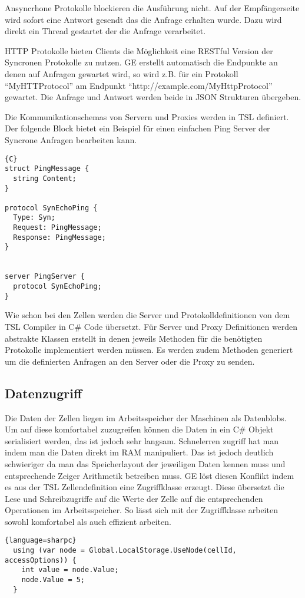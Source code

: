 Ansyncrhone Protokolle blockieren die Ausführung nicht. Auf der Empfängerseite wird sofort eine Antwort gesendt das die Anfrage erhalten wurde. Dazu
wird direkt ein Thread gestartet der die Anfrage verarbeitet.

HTTP Protokolle bieten Clients die Möglichkeit eine RESTful Version der Syncronen Protokolle zu nutzen. GE erstellt automatisch die Endpunkte an denen
auf Anfragen gewartet wird, so wird z.B. für ein Protokoll ``MyHTTProtocol'' am Endpunkt ``http://example.com/MyHttpProtocol'' gewartet. Die Anfrage und
Antwort werden beide in JSON Strukturen übergeben.

Die Kommunikationschemas von Servern und Proxies werden in TSL definiert. Der folgende Block bietet ein Beispiel für einen einfachen Ping Server der
Syncrone Anfragen bearbeiten kann.

\begin{lstlisting}{C}
struct PingMessage {
  string Content;
}

protocol SynEchoPing {
  Type: Syn;
  Request: PingMessage;
  Response: PingMessage;
}


server PingServer {
  protocol SynEchoPing;
}
\end{lstlisting}

Wie schon bei den Zellen werden die Server und Protokolldefinitionen von dem TSL Compiler in C\# Code übersetzt. Für Server und Proxy
Definitionen werden abstrakte Klassen erstellt in denen jeweils Methoden für die benötigten Protokolle implementiert werden müssen.
Es werden zudem Methoden generiert um die definierten Anfragen an den Server oder die Proxy zu senden.


\subsection{Datenzugriff}

Die Daten der Zellen liegen im Arbeitsspeicher der Maschinen als Datenblobs. Um auf diese komfortabel zuzugreifen können die Daten in ein C\# Objekt
serialisiert werden, das ist jedoch sehr langsam.
Schnelerren zugriff hat man indem man die Daten direkt im RAM manipuliert. Das ist jedoch deutlich schwieriger da man das Speicherlayout der jeweiligen Daten
kennen muss und entsprechende Zeiger Arithmetik betreiben muss. GE löst diesen Konflikt indem es aus der TSL Zellendefinition eine Zugriffklasse erzeugt.
Diese übersetzt die Lese und Schreibzugriffe auf die Werte der Zelle auf die entsprechenden Operationen im Arbeitsspeicher. So lässt sich mit der Zugriffklasse arbeiten sowohl
komfortabel als auch effizient arbeiten.

\begin{lstlisting}{language=sharpc}
  using (var node = Global.LocalStorage.UseNode(cellId, accessOptions)) {
    int value = node.Value;
    node.Value = 5;
  }
\end{lstlisting}
